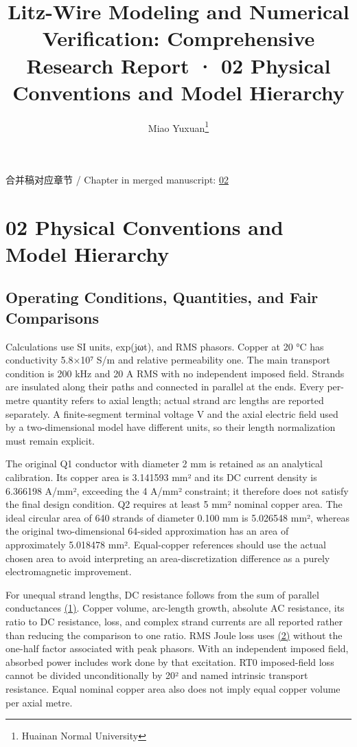 \documentclass[journal,10pt]{IEEEtran}
\begin{document}
\title{Litz-Wire Modeling and Numerical Verification: Comprehensive Research Report · 02 Physical Conventions and Model Hierarchy}
\author{Miao Yuxuan\thanks{Huainan Normal University}}

\maketitle
\noindent 合并稿对应章节 / Chapter in merged manuscript: \href{report_en_ieee.pdf#chapter-02}{02}\par
\FloatBarrier
\section*{02 Physical Conventions and Model Hierarchy}
\hypertarget{chapter-02}{}
\subsection*{Operating Conditions, Quantities, and Fair Comparisons}
\hypertarget{02.conventions.heading}{}
Calculations use SI units, exp(jωt), and RMS phasors. Copper at 20 °C has conductivity 5.8×10⁷ S/m and relative permeability one. The main transport condition is 200 kHz and 20 A RMS with no independent imposed field. Strands are insulated along their paths and connected in parallel at the ends. Every per-metre quantity refers to axial length; actual strand arc lengths are reported separately. A finite-segment terminal voltage V and the axial electric field used by a two-dimensional model have different units, so their length normalization must remain explicit.


The original Q1 conductor with diameter 2 mm is retained as an analytical calibration. Its copper area is 3.141593 mm² and its DC current density is 6.366198 A/mm², exceeding the 4 A/mm² constraint; it therefore does not satisfy the final design condition. Q2 requires at least 5 mm² nominal copper area. The ideal circular area of 640 strands of diameter 0.100 mm is 5.026548 mm², whereas the original two-dimensional 64-sided approximation has an area of approximately 5.018478 mm². Equal-copper references should use the actual chosen area to avoid interpreting an area-discretization difference as a purely electromagnetic improvement.


For unequal strand lengths, DC resistance follows from the sum of parallel conductances \href{report_en_ieee.pdf#E01}{(1)}. Copper volume, arc-length growth, absolute AC resistance, its ratio to DC resistance, loss, and complex strand currents are all reported rather than reducing the comparison to one ratio. RMS Joule loss uses \href{report_en_ieee.pdf#E02}{(2)} without the one-half factor associated with peak phasors. With an independent imposed field, absorbed power includes work done by that excitation. RT0 imposed-field loss cannot be divided unconditionally by 20² and named intrinsic transport resistance. Equal nominal copper area also does not imply equal copper volume per axial metre.
\end{document}
